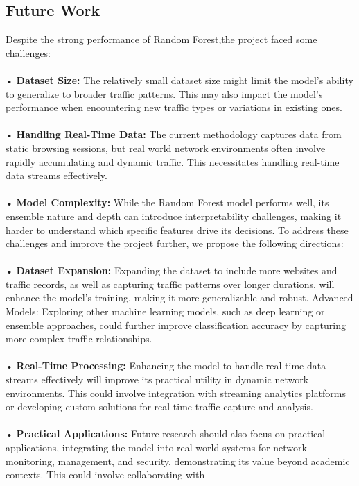 \documentclass[10pt,sigconf,letterpaper,nonacm]{acmart}
\begin{document}
\subsection{Future Work}
Despite the strong performance of Random Forest,the project faced some challenges:\\\\
• \textbf{Dataset Size:} The relatively small dataset size might
limit the model’s ability to generalize to broader traffic
patterns. This may also impact the model’s performance
when encountering new traffic types or variations in
existing ones.\\\\
• \textbf{Handling Real-Time Data:} The current methodology
captures data from static browsing sessions, but real
world network environments often involve rapidly accumulating and dynamic traffic. This necessitates handling
real-time data streams effectively.\\\\
• \textbf{Model Complexity:} While the Random Forest model
performs well, its ensemble nature and depth can introduce interpretability challenges, making it harder to
understand which specific features drive its decisions.
To address these challenges and improve the project further, we propose the following directions:\\\\
• \textbf{Dataset Expansion:} Expanding the dataset to include
more websites and traffic records, as well as capturing
traffic patterns over longer durations, will enhance the
model’s training, making it more generalizable and robust.
Advanced Models: Exploring other machine learning
models, such as deep learning or ensemble approaches,
could further improve classification accuracy by capturing more complex traffic relationships.\\\\
• \textbf{Real-Time Processing:} Enhancing the model to handle
real-time data streams effectively will improve its practical utility in dynamic network environments. This could
involve integration with streaming analytics platforms or
developing custom solutions for real-time traffic capture
and analysis.\\\\
• \textbf{Practical Applications:} Future research should also
focus on practical applications, integrating the model
into real-world systems for network monitoring, management, and security, demonstrating its value beyond
academic contexts. This could involve collaborating with
\end{document}
